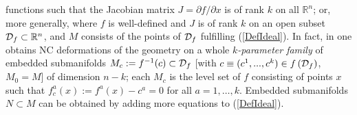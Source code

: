 \documentclass[a4paper,11pt]{article}
\newcommand{\RR}{\mathbb{R}}
\begin{document}
functions such that the Jacobian matrix $J=\partial f/\partial x$ is of rank $k$ 
on all $\RR^n$; or, more generally, where $f$ is well-defined and $J$ is of rank $k$ on an open
subset ${\cal D}_f\subset\RR^n$,  and $M$
consists  of the points of  ${\cal D}_f$  fulfilling (\ref{DefIdeal}).
In fact, in \cite{FioFraWebquadrics,FioreWeber} one obtains NC deformations of the geometry on a whole {\it $k$-parameter family} of embedded submanifolds $M_c:=f^{-1}(c)\subset {\cal D}_f$ [with $c \equiv(c^1,...,c^k)\in f\left({\cal D}_f\right)$, \ $M_0=M$] of dimension $n\!-\!k$; each $M_c$ is the level set of $f$ consisting of points $x$ such that $ f^a_c(x):=f^a(x)-c^a=0$
for all $a=1,\ldots,k$. 
Embedded submanifolds $N\subset M$ can be obtained by
adding more equations to (\ref{DefIdeal}).   
\end{document}
